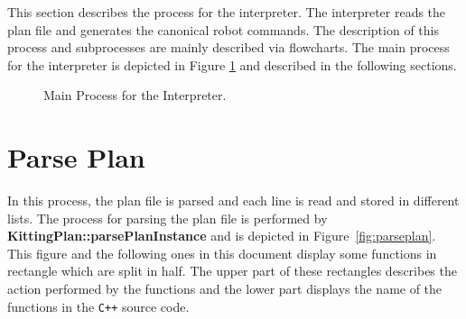 
This section describes the process for the interpreter. The interpreter reads the plan file and generates the canonical robot commands. The description of this process and subprocesses are mainly described via flowcharts. The main process for the interpreter is depicted in Figure \ref{fig:interpreter} and described in the following sections.


\begin{figure}[h!]
\centering
{}
\caption{Main Process for the Interpreter.}
\label{fig:interpreter}
\end{figure}
\newpage


\section{Parse Plan}\label{ss:parseplan}
In this process, the plan file is parsed and each line is read and stored in different lists. The process for parsing the plan file is performed by \textbf{\footnotesize{KittingPlan::parsePlanInstance}} and is depicted in Figure~\ref{fig:parseplan}. This figure and the following ones in this document display some functions in rectangle which are split in half. The upper part of these rectangles describes the action performed by the functions and the lower part displays the name of the functions in the \verb!C++! source code.


